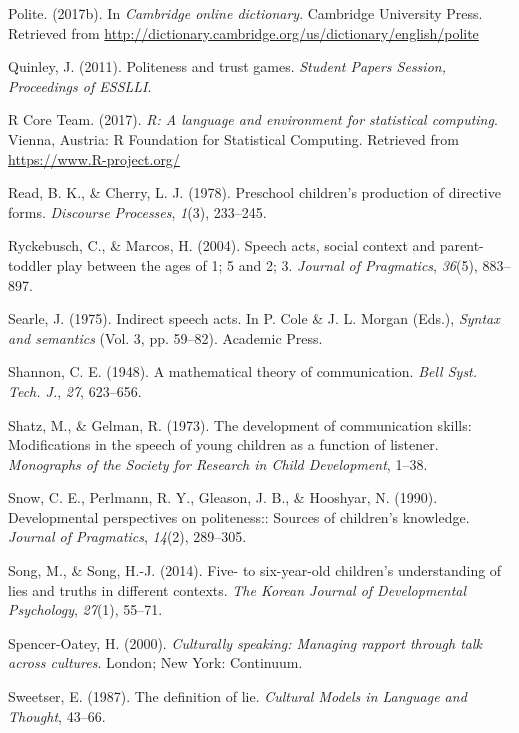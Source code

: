 \documentclass[oneside]{report}
\begin{document}
\hypertarget{ref-cambridgePolite}{}
Polite. (2017b). In \emph{Cambridge online dictionary}. Cambridge
University Press. Retrieved from
\url{http://dictionary.cambridge.org/us/dictionary/english/polite}

\hypertarget{ref-quinley2011}{}
Quinley, J. (2011). Politeness and trust games. \emph{Student Papers
Session, Proceedings of ESSLLI}.

\hypertarget{ref-R-base}{}
R Core Team. (2017). \emph{R: A language and environment for statistical
computing}. Vienna, Austria: R Foundation for Statistical Computing.
Retrieved from \url{https://www.R-project.org/}

\hypertarget{ref-read1978}{}
Read, B. K., \& Cherry, L. J. (1978). Preschool children's production of
directive forms. \emph{Discourse Processes}, \emph{1}(3), 233--245.

\hypertarget{ref-ryckebusch2004}{}
Ryckebusch, C., \& Marcos, H. (2004). Speech acts, social context and
parent-toddler play between the ages of 1; 5 and 2; 3. \emph{Journal of
Pragmatics}, \emph{36}(5), 883--897.

\hypertarget{ref-searle1975}{}
Searle, J. (1975). Indirect speech acts. In P. Cole \& J. L. Morgan
(Eds.), \emph{Syntax and semantics} (Vol. 3, pp. 59--82). Academic
Press.

\hypertarget{ref-shannon1948}{}
Shannon, C. E. (1948). A mathematical theory of communication.
\emph{Bell Syst. Tech. J.}, \emph{27}, 623--656.

\hypertarget{ref-shatz1973}{}
Shatz, M., \& Gelman, R. (1973). The development of communication
skills: Modifications in the speech of young children as a function of
listener. \emph{Monographs of the Society for Research in Child
Development}, 1--38.

\hypertarget{ref-snow1990}{}
Snow, C. E., Perlmann, R. Y., Gleason, J. B., \& Hooshyar, N. (1990).
Developmental perspectives on politeness:: Sources of children's
knowledge. \emph{Journal of Pragmatics}, \emph{14}(2), 289--305.

\hypertarget{ref-song2014}{}
Song, M., \& Song, H.-J. (2014). Five- to six-year-old children's
understanding of lies and truths in different contexts. \emph{The Korean
Journal of Developmental Psychology}, \emph{27}(1), 55--71.

\hypertarget{ref-spencer2000}{}
Spencer-Oatey, H. (2000). \emph{Culturally speaking: Managing rapport
through talk across cultures}. London; New York: Continuum.

\hypertarget{ref-sweetser1987}{}
Sweetser, E. (1987). The definition of lie. \emph{Cultural Models in
Language and Thought}, 43--66.
\end{document}
